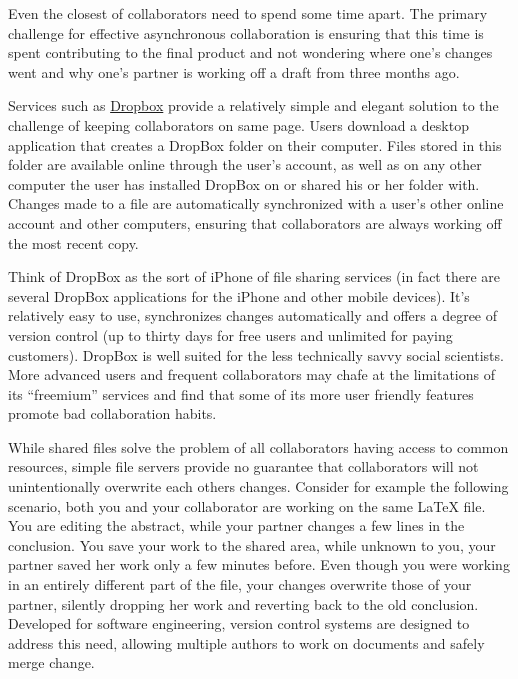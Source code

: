 \documentclass[]{article}
\begin{document}

Even the closest of collaborators need to spend some time apart. The primary
challenge for effective asynchronous collaboration is ensuring that this time 
is spent contributing to the final product and not wondering where one's 
changes went and why one's partner is working off a draft from three months ago.

Services such as \href{href://www.dropbox.com}{Dropbox} provide a relatively 
simple and elegant solution to the challenge of keeping collaborators on same 
page. Users download a desktop application that creates a DropBox folder on
their computer. Files stored in this folder are available online through the 
user's account, as well as on any other computer the user has installed DropBox 
on or shared his or her folder with. Changes made to a file are automatically
synchronized with a user's other online account and other computers, ensuring that
collaborators are always working off the most recent copy.

Think of DropBox as the sort of iPhone of file sharing services (in fact there
are several DropBox applications for the iPhone and other mobile devices). It's relatively easy to use, synchronizes changes automatically and offers a degree 
of version control (up to thirty days for free users and unlimited for paying 
customers). DropBox is well suited for the less technically savvy social 
scientists. More advanced users and frequent collaborators may chafe at the 
limitations of its ``freemium'' services and find that some of its more user
friendly features promote bad collaboration habits.

While shared files solve the problem of all collaborators having
access to common resources, simple file servers provide no guarantee that
collaborators will not unintentionally overwrite each others changes. Consider
for example the following scenario, both you and your collaborator are working
on the same LaTeX file. You are editing the abstract, while your partner
changes a few lines in the conclusion. You save your work to the shared area,
while unknown to you, your partner saved her work only a few minutes before.
Even though you were working in an entirely different part of the file, your
changes overwrite those of your partner, silently dropping her work and
reverting back to the old conclusion. Developed for software engineering,
version control systems are designed to address this need, allowing multiple
authors to work on documents and safely merge change. 
\end{document}
